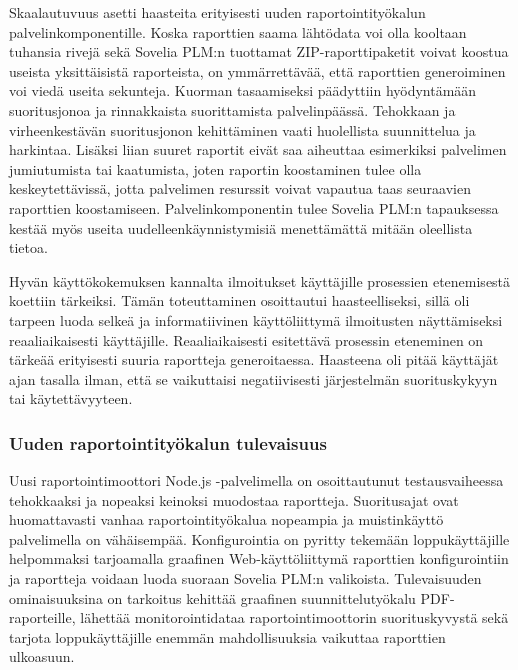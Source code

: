 Skaalautuvuus asetti haasteita erityisesti uuden raportointityökalun palvelinkomponentille. Koska raporttien saama lähtödata voi olla kooltaan tuhansia rivejä sekä Sovelia PLM:n tuottamat ZIP-raporttipaketit voivat koostua useista yksittäisistä raporteista, on ymmärrettävää, että raporttien generoiminen voi viedä useita sekunteja. Kuorman tasaamiseksi päädyttiin hyödyntämään suoritusjonoa ja rinnakkaista suorittamista palvelinpäässä. Tehokkaan ja virheenkestävän suoritusjonon kehittäminen vaati huolellista suunnittelua ja harkintaa. Lisäksi liian suuret raportit eivät saa aiheuttaa esimerkiksi palvelimen jumiutumista tai kaatumista, joten raportin koostaminen tulee olla keskeytettävissä, jotta palvelimen resurssit voivat vapautua taas seuraavien raporttien koostamiseen. Palvelinkomponentin tulee Sovelia PLM:n tapauksessa kestää myös useita uudelleenkäynnistymisiä menettämättä mitään oleellista tietoa.

Hyvän käyttökokemuksen kannalta ilmoitukset käyttäjille prosessien etenemisestä koettiin tärkeiksi. Tämän toteuttaminen osoittautui haasteelliseksi, sillä oli tarpeen luoda selkeä ja informatiivinen käyttöliittymä ilmoitusten näyttämiseksi reaaliaikaisesti käyttäjille. Reaaliaikaisesti esitettävä prosessin eteneminen on tärkeää erityisesti suuria raportteja generoitaessa. Haasteena oli pitää käyttäjät ajan tasalla ilman, että se vaikuttaisi negatiivisesti järjestelmän suorituskykyyn tai käytettävyyteen.

\subsubsection{Uuden raportointityökalun tulevaisuus}

Uusi raportointimoottori Node.js -palvelimella on osoittautunut testausvaiheessa tehokkaaksi ja nopeaksi keinoksi muodostaa raportteja. Suoritusajat ovat huomattavasti vanhaa raportointityökalua nopeampia ja muistinkäyttö palvelimella on vähäisempää. Konfigurointia on pyritty tekemään loppukäyttäjille helpommaksi tarjoamalla graafinen Web-käyttöliittymä raporttien konfigurointiin ja raportteja voidaan luoda suoraan Sovelia PLM:n valikoista. Tulevaisuuden ominaisuuksina on tarkoitus kehittää graafinen suunnittelutyökalu PDF-raporteille, lähettää monitorointidataa raportointimoottorin suorituskyvystä sekä tarjota loppukäyttäjille enemmän mahdollisuuksia vaikuttaa raporttien ulkoasuun.


